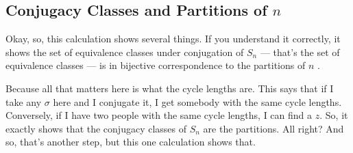\subsection{Conjugacy Classes and Partitions of \texorpdfstring{$n$}{n}}

\begin{speech}[00:38:57 - 00:40:06]
Okay, so, this calculation shows several things. If you understand it correctly, it shows the set of equivalence classes under conjugation of $S_n$ --- that's the set of equivalence classes --- is in bijective correspondence to the partitions of $n$ .

Because all that matters here is what the cycle lengths are. This says that if I take any $\sigma$ here and I conjugate it, I get somebody with the same cycle lengths. Conversely, if I have two people with the same cycle lengths, I can find a $z$. So, it exactly shows that the conjugacy classes of $S_n$ are the partitions. All right? And so, that's another step, but this one calculation shows that.
\end{speech}

